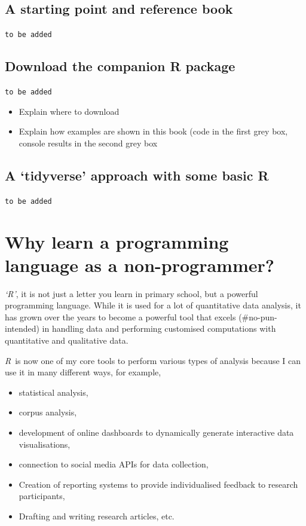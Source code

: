 \documentclass[
]{book}
\providecommand{\tightlist}{%
  \setlength{\itemsep}{0pt}\setlength{\parskip}{0pt}}
\begin{document}
\hypertarget{a-starting-point-and-reference-book}{%
\section{A starting point and reference book}\label{a-starting-point-and-reference-book}}

\texttt{to\ be\ added}

\hypertarget{download-the-companion-r-package}{%
\section{Download the companion R package}\label{download-the-companion-r-package}}

\texttt{to\ be\ added}

\begin{itemize}
\item
  Explain where to download
\item
  Explain how examples are shown in this book (code in the first grey box, console results in the second grey box
\end{itemize}

\hypertarget{a-tidyverse-approach-with-some-basic-r}{%
\section{A `tidyverse' approach with some basic R}\label{a-tidyverse-approach-with-some-basic-r}}

\texttt{to\ be\ added}

\hypertarget{why-learn-a-programming-language-as-a-non-programmer}{%
\chapter{Why learn a programming language as a non-programmer?}\label{why-learn-a-programming-language-as-a-non-programmer}}

\emph{`R'}, it is not just a letter you learn in primary school, but a powerful programming language. While it is used for a lot of quantitative data analysis, it has grown over the years to become a powerful tool that excels (\#no-pun-intended) in handling data and performing customised computations with quantitative and qualitative data.

\emph{R}~is now one of my core tools to perform various types of analysis because I can use it in many different ways, for example,

\begin{itemize}
\tightlist
\item
  statistical analysis,
\item
  corpus analysis,
\item
  development of online dashboards to dynamically generate interactive data visualisations,
\item
  connection to social media APIs for data collection,
\item
  Creation of reporting systems to provide individualised feedback to research participants,
\item
  Drafting and writing research articles, etc.
\end{itemize}
\end{document}
